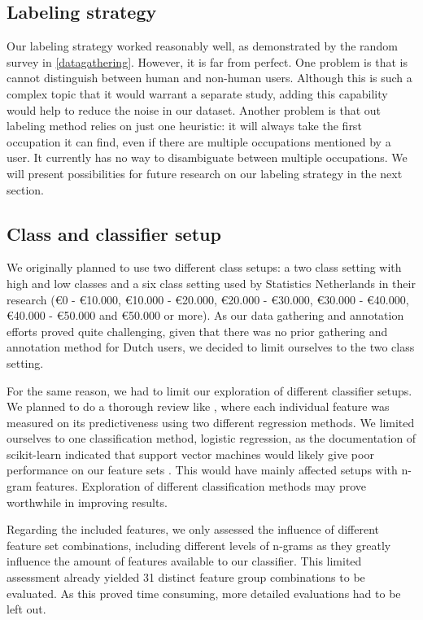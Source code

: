 \documentclass[
10pt, %
a4paper, %
oneside, %
headinclude,footinclude, %
] {book}%
\begin{document}
\subsection{Labeling strategy}
Our labeling strategy worked reasonably well, as demonstrated by the random survey in \autoref{datagathering}. However, it is far from perfect. One problem is that is cannot distinguish between human and non-human users. Although this is such a complex topic that it would warrant a separate study, adding this capability would help to reduce the noise in our dataset. Another problem is that out labeling method relies on just one heuristic: it will always take the first occupation it can find, even if there are multiple occupations mentioned by a user. It currently has no way to disambiguate between multiple occupations. We will present possibilities for future research on our labeling strategy in the next section.

\subsection{Class and classifier setup}
We originally planned to use two different class setups: a two class setting with high and low classes and a six class setting used by Statistics Netherlands in their research (\euro 0 - \euro 10.000, \euro 10.000 - \euro 20.000, \euro 20.000 - \euro 30.000, \euro 30.000 - \euro 40.000, \euro 40.000 - \euro 50.000 and \euro 50.000 or more). As our data gathering and annotation efforts proved quite challenging, given that there was no prior gathering and annotation method for Dutch users, we decided to limit ourselves to the two class setting.

For the same reason, we had to limit our exploration of different classifier setups. We planned to do a thorough review like \citet{flekova}, where each individual feature was measured on its predictiveness using two different regression methods. We limited ourselves to one classification method, logistic regression, as the documentation of scikit-learn indicated that support vector machines would likely give poor performance on our feature sets \citep{svm}. This would have mainly affected setups with n-gram features. Exploration of different classification methods may prove worthwhile in improving results.

Regarding the included features, we only assessed the influence of different feature set combinations, including different levels of n-grams as they greatly influence the amount of features available to our classifier. This limited assessment already yielded 31 distinct feature group combinations to be evaluated. As this proved time consuming, more detailed evaluations had to be left out.
\end{document}
